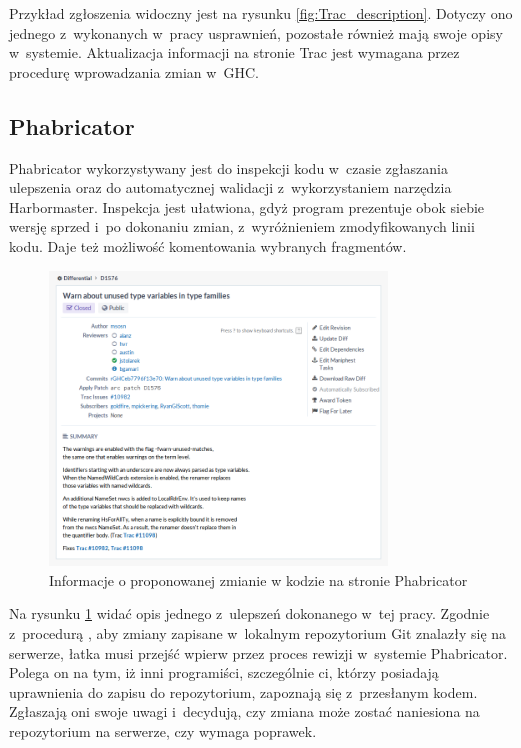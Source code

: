Przykład zgłoszenia widoczny jest na rysunku \ref{fig:Trac_description}. Dotyczy
ono jednego z~wykonanych w~pracy usprawnień, pozostałe również mają swoje opisy
w~systemie. Aktualizacja informacji na stronie Trac jest wymagana przez
procedurę wprowadzania zmian w~GHC\cite{WikiFixingBugs}.

\subsection{Phabricator}

\cite{WikiPhabricator}

Phabricator wykorzystywany jest do inspekcji kodu w~czasie zgłaszania ulepszenia
oraz do automatycznej walidacji z~wykorzystaniem narzędzia
Harbormaster. Inspekcja jest ułatwiona, gdyż program prezentuje obok siebie
wersję sprzed i~po dokonaniu zmian, z~wyróżnieniem zmodyfikowanych linii
kodu. Daje też możliwość komentowania wybranych fragmentów.

\begin{figure}[ht]
    \centering
    \includegraphics[width=0.8\textwidth]{images/Phabricator_summary}
    \caption{Informacje o proponowanej zmianie w kodzie na stronie Phabricator}
    \label{fig:Phabricator_summary}
\end{figure}

Na rysunku \ref{fig:Phabricator_summary} widać opis jednego z~ulepszeń
dokonanego w~tej pracy. Zgodnie z~procedurą \cite{WikiFixingBugs}, aby zmiany
zapisane w~lokalnym repozytorium Git znalazły się na serwerze, łatka musi
przejść wpierw przez proces rewizji w~systemie Phabricator. Polega on na tym, iż
inni programiści, szczególnie ci, którzy posiadają uprawnienia do zapisu do
repozytorium, zapoznają się z~przesłanym kodem. Zgłaszają oni swoje uwagi
i~decydują, czy zmiana może zostać naniesiona na repozytorium na serwerze, czy
wymaga poprawek.

